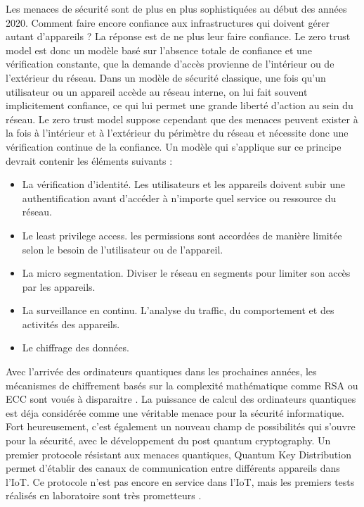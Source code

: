 Les menaces de sécurité sont de plus en plus sophistiquées au début des années 2020. Comment faire encore confiance aux infrastructures qui doivent gérer autant d'appareils ? La réponse est de ne plus leur faire confiance. Le zero trust model est donc un modèle basé sur l'absence totale de confiance et une vérification constante, que la demande d'accès provienne de l'intérieur ou de l'extérieur du réseau. Dans un modèle de sécurité classique, une fois qu'un utilisateur ou un appareil accède au réseau interne, on lui fait souvent implicitement confiance, ce qui lui permet une grande liberté d'action au sein du réseau. Le zero trust model suppose cependant que des menaces peuvent exister à la fois à l’intérieur et à l’extérieur du périmètre du réseau et nécessite donc une vérification continue de la confiance. Un modèle qui s'applique sur ce principe devrait contenir les éléments suivants \cite{zero1} :
\begin{itemize}
\item La vérification d'identité. Les utilisateurs et les appareils doivent subir une authentification avant d'accéder à n'importe quel service ou ressource du réseau.
\item Le least privilege access. les permissions sont accordées de manière limitée selon le besoin de l'utilisateur ou de l'appareil.
\item La micro segmentation. Diviser le réseau en segments pour limiter son accès par les appareils.
\item La surveillance en continu. L'analyse du traffic, du comportement et des activités des appareils.
\item Le chiffrage des données.
\end{itemize}

\vspace{0.1cm}


Avec l'arrivée des ordinateurs quantiques dans les prochaines années, les mécanismes de chiffrement basés sur la complexité mathématique comme \ac{RSA} ou \ac{ECC} sont voués à disparaitre  \cite{quantumcrypto}. La puissance de calcul des ordinateurs quantiques est déja considérée comme une véritable menace pour la sécurité informatique. Fort heureusement, c'est également un nouveau champ de possibilités qui s'ouvre pour la sécurité, avec le développement du post quantum cryptography. Un premier protocole résistant aux menaces quantiques, Quantum Key Distribution permet d'établir des canaux de communication entre différents appareils dans l'\ac{IoT}. Ce protocole n'est pas encore en service dans l'\ac{IoT}, mais les premiers tests réalisés en laboratoire sont très prometteurs \cite{qinternet}.